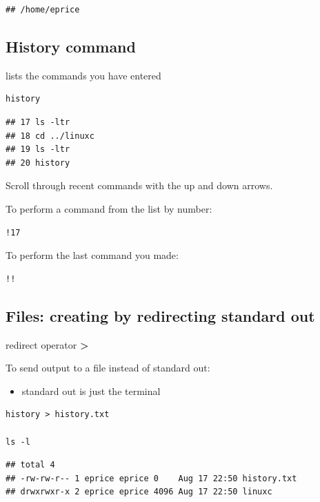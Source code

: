 \documentclass[
]{book}
\providecommand{\tightlist}{%
  \setlength{\itemsep}{0pt}\setlength{\parskip}{0pt}}
\begin{document}
\begin{verbatim}
## /home/eprice
\end{verbatim}

\hypertarget{history-command}{%
\subsection{History command}\label{history-command}}

lists the commands you have entered

\begin{verbatim}
history
\end{verbatim}

\begin{verbatim}
## 17 ls -ltr
## 18 cd ../linuxc
## 19 ls -ltr
## 20 history
\end{verbatim}

Scroll through recent commands with the up and down arrows.

To perform a command from the list by number:

\begin{verbatim}
!17
\end{verbatim}

To perform the last command you made:

\begin{verbatim}
!!
\end{verbatim}

\hypertarget{files-creating-by-redirecting-standard-out}{%
\subsection{Files: creating by redirecting standard out}\label{files-creating-by-redirecting-standard-out}}

redirect operator \textbf{\textgreater{}}

To send output to a file instead of standard out:

\begin{itemize}
\tightlist
\item
  standard out is just the terminal
\end{itemize}

\begin{verbatim}
history > history.txt

ls -l
\end{verbatim}

\begin{verbatim}
## total 4
## -rw-rw-r-- 1 eprice eprice 0    Aug 17 22:50 history.txt
## drwxrwxr-x 2 eprice eprice 4096 Aug 17 22:50 linuxc
\end{verbatim}
\end{document}
